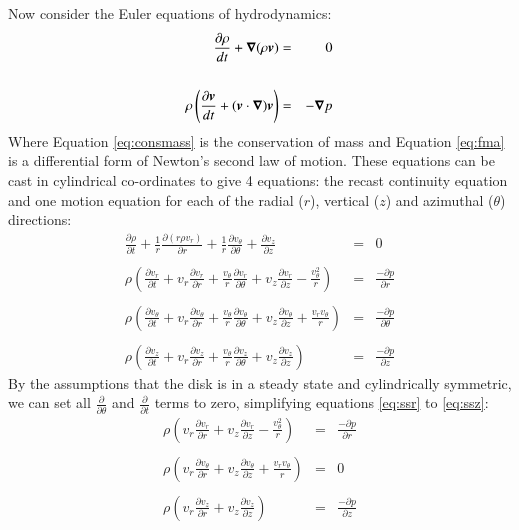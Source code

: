 \par Now consider the Euler equations of hydrodynamics:
\begin{eqnarray}
\frac{\partial\rho}{dt}+\bm{\nabla}(\rho\bm{v})&=&0\label{eq:consmass}\\\nonumber \\
\rho\left(\frac{\partial\bm{v}}{dt}+(\bm{v}\cdot\bm{\nabla}) \bm{v}\right)&=&-\bm{\nabla} p\label{eq:fma}
\end{eqnarray}
Where Equation \ref{eq:consmass} is the conservation of mass and Equation \ref{eq:fma} is a differential form of Newton's second law of motion.  These equations can be cast in cylindrical co-ordinates to give 4 equations: the recast continuity equation and one motion equation for each of the radial ($r$), vertical ($z$) and azimuthal ($\theta$) directions:
\begin{eqnarray}
\frac{\partial\rho}{\partial t}+\frac{1}{r}\frac{\partial(r\rho v_r)}{\partial r}+\frac{1}{r}\frac{\partial v_\theta}{\partial\theta}+\frac{\partial v_z}{\partial z}&=&0\label{eq:ssc}\\\nonumber\\
\rho\left(\frac{\partial v_r}{\partial t}+v_r\frac{\partial v_r}{\partial r}+\frac{v_\theta}{r}\frac{\partial v_r}{\partial\theta}+v_z\frac{\partial v_r}{\partial z}-\frac{v_\theta^2}{r}\right)&=&\frac{-\partial p}{\partial r}\label{eq:ssr}\\\nonumber\\
\rho\left(\frac{\partial v_\theta}{\partial t}+v_r\frac{\partial v_\theta}{\partial r}+\frac{v_\theta}{r}\frac{\partial v_\theta}{\partial\theta}+v_z\frac{\partial v_\theta}{\partial z}+\frac{v_rv_\theta}{r}\right)&=&\frac{-\partial p}{\partial\theta}\\\nonumber\\
\rho\left(\frac{\partial v_z}{\partial t}+v_r\frac{\partial v_z}{\partial r}+\frac{v_\theta}{r}\frac{\partial v_z}{\partial\theta}+v_z\frac{\partial v_z}{\partial z}\right)&=&\frac{-\partial p}{\partial z}\label{eq:ssz}
\end{eqnarray}
By the assumptions that the disk is in a steady state and cylindrically symmetric, we can set all $\frac{\partial}{\partial\theta}$ and $\frac{\partial}{\partial t}$ terms to zero, simplifying equations \ref{eq:ssr} to \ref{eq:ssz}:
\begin{eqnarray}
\rho\left(v_r\frac{\partial v_r}{\partial r}+v_z\frac{\partial v_r}{\partial z}-\frac{v_\theta^2}{r}\right)&=&\frac{-\partial p}{\partial r}\label{eq:ssrs}\\\nonumber\\
\rho\left(v_r\frac{\partial v_\theta}{\partial r}+v_z\frac{\partial v_\theta}{\partial z}+\frac{v_rv_\theta}{r}\right)&=&0\label{eq:ssts}\\\nonumber\\
\rho\left(v_r\frac{\partial v_z}{\partial r}+v_z\frac{\partial v_z}{\partial z}\right)&=&\frac{-\partial p}{\partial z}\label{eq:sszs}
\end{eqnarray}
